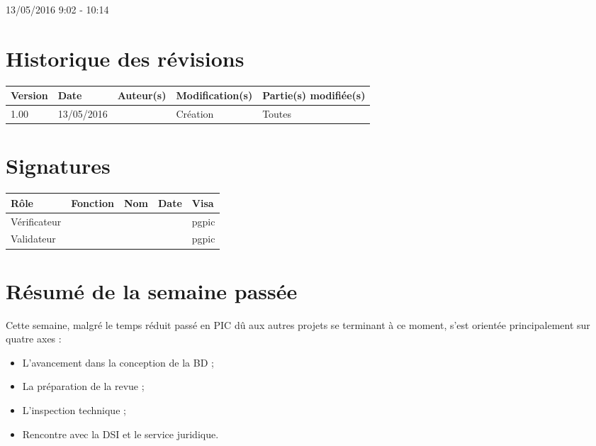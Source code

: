 \documentclass [a4paper] {article}
\begin{document}
13/05/2016			 				%
\hfill   
\hfill 	 9:02 - 10:14				%


\section*{Historique des révisions}
\begin{center}
			\begin{tabular}{| p{2.5cm} | p{3cm} | p{3cm} | p{3cm} | p{3.5cm} |}
				\hline
				\rowcolor{Gray}
				Version & Date & Auteur(s) & Modification(s) & Partie(s) modifiée(s)		 \\
				\hline
				1.00 & 13/05/2016 & \Pierre & Création & Toutes \\
		\hline		
			\end{tabular}
		\end{center}

\section*{Signatures}

		\begin{center}
			\begin{tabular}{| p{2.5cm} | p{4cm} | p{3cm} | p{3cm} | p{2.5cm} |}
				\hline
				\rowcolor{Gray}
				Rôle & Fonction & Nom & Date & Visa		 \\
				\hline
				Vérificateur & \RQA & \Kafui &  & pgpic \\[30pt]
				\hline
				Validateur & \CP & \Sergi &  & pgpic \\[30pt]	
				\hline
			\end{tabular}
		\end{center}


\section{Résumé de la semaine passée}
Cette semaine, malgré le temps réduit passé en PIC dû aux autres projets se terminant à ce moment, s'est orientée principalement sur quatre axes : 
\begin{itemize}
\item L'avancement dans la conception de la BD ;
\item La préparation de la revue ;
\item L'inspection technique ;
\item Rencontre avec la DSI et le service juridique.
\end{itemize} 
\end{document}
